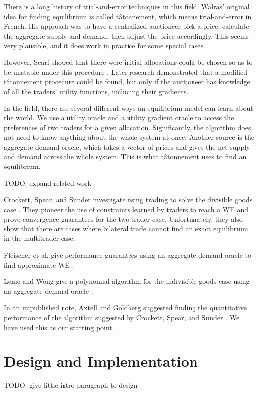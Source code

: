 \documentclass[12pt,a4paper,titlepage]{article}
\begin{document}
There is a long history of trial-and-error techniques in this field.
Walras' original idea for finding equilibrium is called tâtonnement, which means trial-and-error in French.
His approach was to have a centralized auctioneer pick a price, calculate the aggregate supply and demand, then adjust the price accordingly.
This seems very plausible, and it does work in practice for some special cases.

However, Scarf showed that there were initial allocations could be chosen so as to be unstable under this procedure \cite{scarf}.
Later research demonstrated that a modified tâtonnement procedure could be found, but only if the auctioneer has knowledge of all the traders' utility functions, including their gradients.

In the field, there are several different ways an equilibrium model can learn about the world. 
We use a utility oracle and a utility gradient oracle to access the preferences of two traders for a given allocation.
Significantly, the algorithm does not need to know anything about the whole system at once.
Another source is the aggregate demand oracle, which takes a vector of prices and gives the net supply and demand across the whole system.
This is what tâtonnement uses to find an equilibrium.

TODO: expand related work

Crockett, Spear, and Sunder investigate using trading to solve the divisible goods case \cite{crockett}.
They pioneer the use of constraints learned by traders to reach a WE and prove convergence guarantees for the two-trader case.
Unfortunately, they also show that there are cases where bilateral trade cannot find an exact equilibrium in the multitrader case.

Fleischer et al. give performance guarantees using an aggregate demand oracle to find approximate WE \cite{fleischer}.

Leme and Wong give a polynomial algorithm for the indivisible goods case using an aggregate demand oracle \cite{leme}.

In an unpublished note, Axtell and Goldberg suggested finding the quantitative performance of the algorithm suggested by Crockett, Spear, and Sunder \cite{goldberg}.
We have used this as our starting point.



\section{Design and Implementation}\label{desimp}
TODO: give little intro paragraph to design
\end{document}
